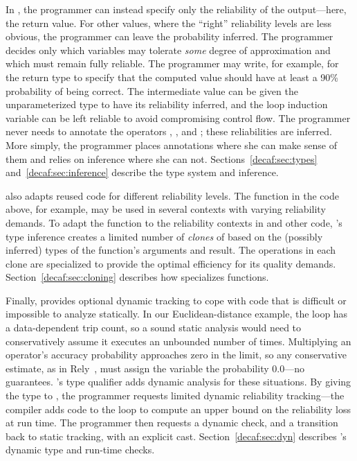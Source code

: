 {In \lang, the programmer can instead specify only the reliability of the
output---here, the return value.
For other values, where the ``right'' reliability levels are less obvious, the
programmer can leave the probability inferred.
The programmer decides only which variables may tolerate \emph{some} degree of
approximation and which must remain fully reliable.
The programmer may write, for example,  for the
return type to specify that the computed value should have at least a 90\%
probability of being correct.
The intermediate value  can be given the
unparameterized type  to have its reliability inferred, and
the loop induction variable  can be left reliable to avoid compromising
control flow.
The programmer never needs to annotate the
operators \code{-}, \code{*}, and \code{+}; these reliabilities are inferred.
More simply, the programmer places annotations where she can make sense of
them and relies on inference where she can not.
Sections~\ref{decaf:sec:types} and~\ref{decaf:sec:inference} describe the type system and
inference.

\lang also adapts reused code for different reliability levels.
The  function in the code above, for example, may be used in
several contexts with varying reliability demands.
To adapt the  function to the reliability contexts in 
and other code,
\lang's type inference creates a limited number of \emph{clones} of
 based on the (possibly inferred) types of the function's arguments
and result.
The operations in each clone are specialized to provide the optimal efficiency
for its quality demands.
Section~\ref{decaf:sec:cloning} describes how \lang specializes
functions.

Finally, \lang provides optional dynamic tracking to cope with code that
is difficult or impossible to analyze statically.
In our Euclidean-distance example, the  loop has a data-dependent
trip count, so a sound static analysis would need to conservatively assume it
executes an unbounded number of times.
Multiplying an operator's accuracy probability approaches zero in the limit,
so any conservative estimate, as in Rely~\cite{rely},
must assign the  variable
the probability 0.0---no guarantees.
\lang's  type qualifier adds dynamic analysis for
these situations.
By giving the type  to , the programmer
requests limited dynamic reliability tracking---the
compiler adds code to the loop to compute an upper bound on the reliability
loss at run time.
The programmer then requests a dynamic check, and a transition back to static
tracking, with an explicit  cast.
Section~\ref{decaf:sec:dyn} describes \lang's dynamic type and run-time checks.

}
